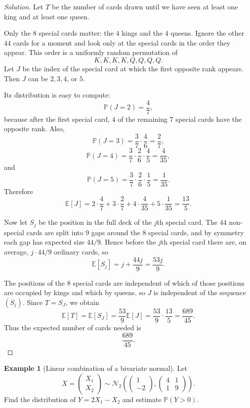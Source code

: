\documentclass[11pt]{article}
\theoremstyle{definition}
\newtheorem{example}{Example}[section]
\newcommand{\E}{\mathbb{E}}
\begin{document}
\begin{proof}[Solution]
Let $T$ be the number of cards drawn until we have seen at least one king and at least one queen.

Only the $8$ special cards matter: the $4$ kings and the $4$ queens. Ignore the other $44$ cards for a moment and look only at the special cards in the order they appear. This order is a uniformly random permutation of
\[
K,K,K,K,Q,Q,Q,Q.
\]
Let $J$ be the index of the special card at which the first opposite rank appears. Then $J$ can be $2,3,4$, or $5$.

Its distribution is easy to compute:
\[
\mathbb{P}(J=2)=\frac47,
\]
because after the first special card, $4$ of the remaining $7$ special cards have the opposite rank. Also,
\[
\mathbb{P}(J=3)=\frac37\cdot\frac46=\frac27,
\]
\[
\mathbb{P}(J=4)=\frac37\cdot\frac26\cdot\frac45=\frac4{35},
\]
and
\[
\mathbb{P}(J=5)=\frac37\cdot\frac26\cdot\frac15=\frac1{35}.
\]
Therefore
\[
\E[J]=2\cdot\frac47+3\cdot\frac27+4\cdot\frac4{35}+5\cdot\frac1{35}=\frac{13}{5}.
\]

Now let $S_j$ be the position in the full deck of the $j$th special card. The $44$ non-special cards are split into $9$ gaps around the $8$ special cards, and by symmetry each gap has expected size $44/9$. Hence before the $j$th special card there are, on average, $j\cdot 44/9$ ordinary cards, so
\[
\E[S_j]=j+\frac{44j}{9}=\frac{53j}{9}.
\]

The positions of the $8$ special cards are independent of which of those positions are occupied by kings and which by queens, so $J$ is independent of the sequence $(S_j)$. Since $T=S_J$, we obtain
\[
\E[T]=\E[S_J]=\frac{53}{9}\E[J]=\frac{53}{9}\cdot\frac{13}{5}=\frac{689}{45}.
\]
Thus the expected number of cards needed is
\[
\boxed{\frac{689}{45}}.
\]
\end{proof}

\begin{example}[Linear combination of a bivariate normal]
Let
\[
X=\begin{pmatrix}X_1\\X_2\end{pmatrix}
\sim \mathcal{N}_2\!\left(
\begin{pmatrix}1\\-2\end{pmatrix},
\begin{pmatrix}4&1\\1&9\end{pmatrix}
\right).
\]
Find the distribution of $Y=2X_1-X_2$ and estimate $\mathbb{P}(Y>0)$.
\end{example}
\end{document}
